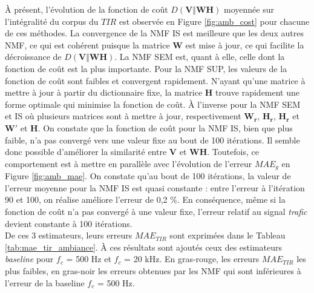 À présent, l'évolution de la fonction de coût $D(\mathbf{V}\Vert \mathbf{WH})$ moyennée sur l'intégralité du corpus du $TIR$ est observée en Figure \ref{fig:amb_cost} pour chacune de ces méthodes. La convergence de la NMF IS est meilleure que les deux autres NMF, ce qui est cohérent puisque la matrice $\mathbf{W}$ est mise à jour, ce qui facilite la décroissance de $D(\mathbf{V}\Vert \mathbf{WH})$. La NMF SEM est, quant à elle, celle dont la fonction de coût est la plus importante. Pour la NMF SUP, les valeurs de la fonction de coût sont faibles et convergent rapidement. N'ayant qu'une matrice à mettre à jour à partir du dictionnaire fixe, la matrice $\mathbf{H}$ trouve rapidement une forme optimale qui minimise la fonction de coût. À l'inverse pour la NMF SEM et IS où plusieurs matrices sont à mettre à jour, respectivement $\mathbf{W_r}$, $\mathbf{H_r}$, $\mathbf{H_r}$ et $\mathbf{W'}$ et $\mathbf{H}$. On constate que la fonction de coût pour la NMF IS, bien que plus faible, n'a pas convergé vers une valeur fixe au bout de 100 itérations. Il semble donc possible d'améliorer la similarité entre $\mathbf{V}$ et $\mathbf{WH}$. Toutefois, ce comportement est à mettre en parallèle avec l'évolution de l'erreur $MAE_g$ en Figure \ref{fig:amb_mae}. On constate qu'au bout de 100 itérations, la valeur de l'erreur moyenne pour la NMF IS est quasi constante : entre l'erreur à l'itération 90 et 100, on réalise améliore l'erreur de 0,2 $\%$. En conséquence, même si la fonction de coût n'a pas convergé à une valeur fixe, l'erreur relatif au signal \textit{trafic} devient constante à 100 itérations.\\

De ces 3 estimateurs, leurs erreurs $MAE_{TIR}$ sont exprimées dans le Tableau \ref{tab:mae_tir_ambiance}. À ces résultats sont ajoutés ceux des estimateurs \textit{baseline} pour $f_c$ = 500 Hz et $f_c$ = 20 kHz. En gras-rouge, les erreurs $MAE_{TIR}$ les plus faibles, en gras-noir les erreurs obtenues par les NMF qui sont inférieures à l'erreur de la baseline $f_c$ = 500 Hz.\\

